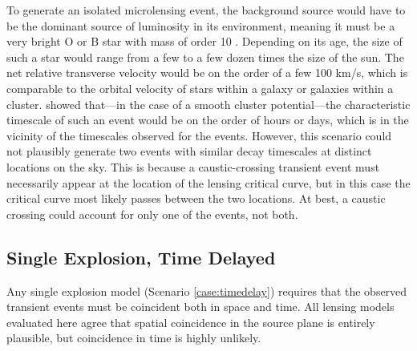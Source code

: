 To generate an isolated microlensing event, the background source
would have to be the dominant source of luminosity in its environment,
meaning it must be a very bright O or B star with mass of order 10
\Msun.  Depending on its age, the size of such a star would range from
a few to a few dozen times the size of the sun.  The net relative
transverse velocity would be on the order of a few 100 km/s, which is
comparable to the orbital velocity of stars within a galaxy or
galaxies within a cluster.  \citet{MiraldaEscude:1991} showed
that---in the case of a smooth cluster potential---the
%
%
%
characteristic timescale of such an event would be on the order of
hours or days, which is in the vicinity of the timescales observed for
the \spock events.  However, this scenario could not plausibly
generate two events with similar decay timescales at distinct
locations on the sky.  This is because a caustic-crossing transient
event must necessarily appear at the location of the lensing critical
curve, but in this case the critical curve most likely passes between
the two \spock locations. At best, a caustic crossing could account
for only one of the \spock events, not both.


\subsection{Single Explosion, Time Delayed}

Any single explosion model (Scenario \ref{case:timedelay}) requires
that the observed transient events must be coincident both in space
and time.  All lensing models evaluated here agree that spatial
coincidence in the source plane is entirely plausible, but coincidence
in time is highly unlikely.


